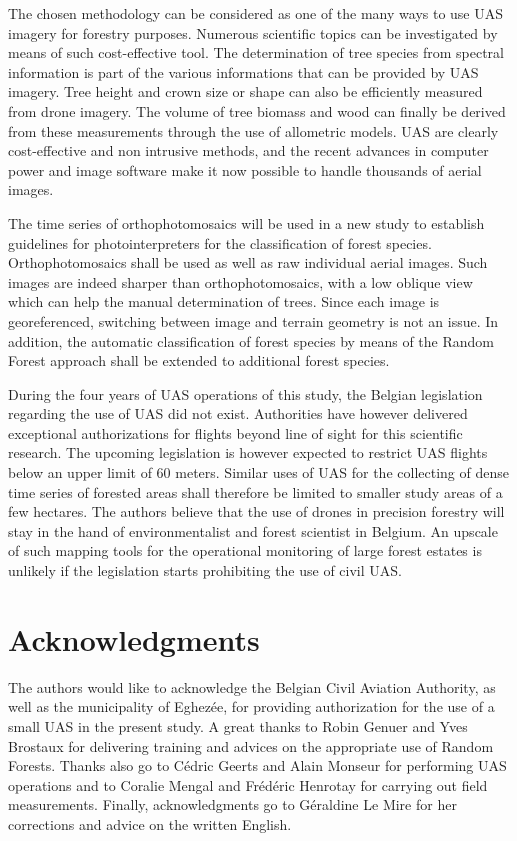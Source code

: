 \documentclass[remotesensing,article,submit,moreauthors,pdftex,12pt,a4paper]{mdpi} %
\begin{document}
The chosen methodology can be considered as one of the many ways to use UAS imagery for forestry purposes. 
Numerous scientific topics can be investigated by means of such cost-effective tool. 
The determination of tree species from spectral information is part of the various informations that can be provided by UAS imagery. 
Tree height and crown size or shape can also be efficiently measured from drone imagery. 
The volume of tree biomass and wood can finally be derived from these measurements through the use of allometric models.
UAS are clearly cost-effective and non intrusive methods, and the recent advances in computer power and image software make it now possible to handle thousands of aerial images.

The time series of orthophotomosaics will be used in a new study to establish guidelines for photointerpreters for the classification of forest species. 
Orthophotomosaics shall be used as well as raw individual aerial images. 
Such images are indeed sharper than orthophotomosaics, with a low oblique view which can help the manual determination of trees. 
Since each image is georeferenced, switching between image and terrain geometry is not an issue. 
In addition, the automatic classification of forest species by means of the Random Forest approach shall be extended to additional forest species.

During the four years of UAS operations of this study, the Belgian legislation regarding the use of UAS did not exist. 
Authorities have however delivered exceptional authorizations for flights beyond line of sight for this scientific research. 
The upcoming legislation is however expected to restrict UAS flights below an upper limit of 60 meters. 
Similar uses of UAS for the collecting of dense time series of forested areas shall therefore be limited to smaller study areas of a few hectares. 
The authors believe that the use of drones in precision forestry will stay in the hand of environmentalist and forest scientist in Belgium. 
An upscale of such mapping tools for the operational monitoring of large forest estates is unlikely if the legislation starts prohibiting the use of civil UAS. 

\section*{\noindent Acknowledgments}
\vspace{12pt}

The authors would like to acknowledge the Belgian Civil Aviation Authority, as well as the municipality of Eghezée, for providing authorization for the use of a small UAS in the present study. 
A great thanks to Robin Genuer and Yves Brostaux for delivering training and advices on the appropriate use of Random Forests. 
Thanks also go to C\'edric Geerts and Alain Monseur for performing UAS operations and to Coralie Mengal and Fr\'ed\'eric Henrotay for carrying out field measurements. 
Finally, acknowledgments go to G\'eraldine Le Mire for her corrections and advice on the written English.
\end{document}
